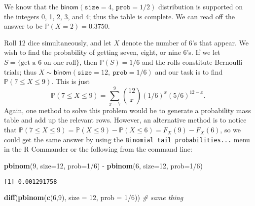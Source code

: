 \documentclass[]{book}
\newenvironment{Shaded}{\begin{snugshade}}{\end{snugshade}}
\newcommand{\KeywordTok}[1]{\textcolor[rgb]{0.13,0.29,0.53}{\textbf{{#1}}}}
\newcommand{\DataTypeTok}[1]{\textcolor[rgb]{0.13,0.29,0.53}{{#1}}}
\newcommand{\DecValTok}[1]{\textcolor[rgb]{0.00,0.00,0.81}{{#1}}}
\newcommand{\StringTok}[1]{\textcolor[rgb]{0.31,0.60,0.02}{{#1}}}
\newcommand{\CommentTok}[1]{\textcolor[rgb]{0.56,0.35,0.01}{\textit{{#1}}}}
\newcommand{\NormalTok}[1]{{#1}}
\numberwithin{equation}{chapter}
\numberwithin{figure}{chapter}
\theoremstyle{plain}
\theoremstyle{definition}
\theoremstyle{remark}
\theoremstyle{definition}
\theoremstyle{definition}
\theoremstyle{remark}
\let\BeginKnitrBlock\begin \let\EndKnitrBlock\end
\begin{document}
We know that the \(\mathsf{binom}(\mathtt{size}=4,\,\mathtt{prob}=1/2)\)
distribution is supported on the integers 0, 1, 2, 3, and 4; thus the
table is complete. We can read off the answer to be
\(\mathbb{P}(X=2)=0.3750\).

\bigskip

\BeginKnitrBlock{example}
\protect\hypertarget{ex:unnamed-chunk-208}{}{\label{ex:unnamed-chunk-208}}Roll
12 dice simultaneously, and let \(X\) denote the number of 6's that
appear. We wish to find the probability of getting seven, eight, or nine
6's. If we let \(S=\{ \mbox{get a 6 on one roll} \}\), then
\(\mathbb{P}(S)=1/6\) and the rolls constitute Bernoulli trials; thus
\(X\sim\mathsf{binom}(\mathtt{size}=12,\ \mathtt{prob}=1/6)\) and our
task is to find \(\mathbb{P}(7\leq X\leq9)\). This is just \[ 
\mathbb{P}(7\leq X\leq9)=\sum_{x=7}^{9}{12 \choose x}(1/6)^{x}(5/6)^{12-x}.
\] Again, one method to solve this problem would be to generate a
probability mass table and add up the relevant rows. However, an
alternative method is to notice that
\(\mathbb{P}(7\leq X\leq9)=\mathbb{P}(X\leq9)-\mathbb{P}(X\leq6)=F_{X}(9)-F_{X}(6)\),
so we could get the same answer by using the
\texttt{Binomial\ tail\ probabilities...} menu in the R Commander or the
following from the command line:
\EndKnitrBlock{example}

\begin{Shaded}
\begin{Highlighting}[]
\KeywordTok{pbinom}\NormalTok{(}\DecValTok{9}\NormalTok{, }\DataTypeTok{size=}\DecValTok{12}\NormalTok{, }\DataTypeTok{prob=}\DecValTok{1}\NormalTok{/}\DecValTok{6}\NormalTok{) -}\StringTok{ }\KeywordTok{pbinom}\NormalTok{(}\DecValTok{6}\NormalTok{, }\DataTypeTok{size=}\DecValTok{12}\NormalTok{, }\DataTypeTok{prob=}\DecValTok{1}\NormalTok{/}\DecValTok{6}\NormalTok{)}
\end{Highlighting}
\end{Shaded}

\begin{verbatim}
[1] 0.001291758
\end{verbatim}

\begin{Shaded}
\begin{Highlighting}[]
\KeywordTok{diff}\NormalTok{(}\KeywordTok{pbinom}\NormalTok{(}\KeywordTok{c}\NormalTok{(}\DecValTok{6}\NormalTok{,}\DecValTok{9}\NormalTok{), }\DataTypeTok{size =} \DecValTok{12}\NormalTok{, }\DataTypeTok{prob =} \DecValTok{1}\NormalTok{/}\DecValTok{6}\NormalTok{))  }\CommentTok{# same thing}
\end{Highlighting}
\end{Shaded}
\end{document}
